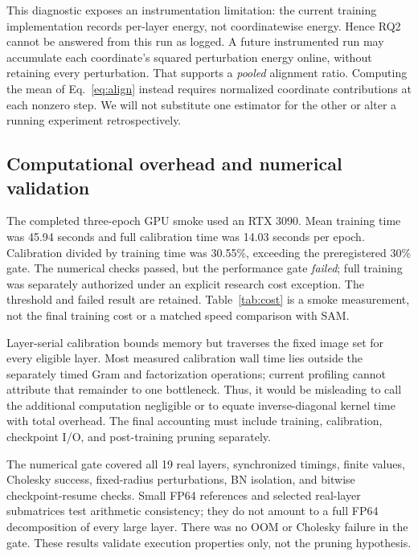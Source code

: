 This diagnostic exposes an instrumentation limitation: the current training implementation records per-layer energy, not coordinatewise energy. Hence RQ2 cannot be answered from this run as logged. A future instrumented run may accumulate each coordinate's squared perturbation energy online, without retaining every perturbation. That supports a \emph{pooled} alignment ratio. Computing the mean of Eq.~\eqref{eq:align} instead requires normalized coordinate contributions at each nonzero step. We will not substitute one estimator for the other or alter a running experiment retrospectively.

\subsection{Computational overhead and numerical validation}
\PerformanceTable
The completed three-epoch GPU smoke used an RTX 3090. Mean training time was 45.94 seconds and full calibration time was 14.03 seconds per epoch. Calibration divided by training time was 30.55\%, exceeding the preregistered 30\% gate. The numerical checks passed, but the performance gate \emph{failed}; full training was separately authorized under an explicit research cost exception. The threshold and failed result are retained. Table~\ref{tab:cost} is a smoke measurement, not the final training cost or a matched speed comparison with SAM.

Layer-serial calibration bounds memory but traverses the fixed image set for every eligible layer. Most measured calibration wall time lies outside the separately timed Gram and factorization operations; current profiling cannot attribute that remainder to one bottleneck. Thus, it would be misleading to call the additional computation negligible or to equate inverse-diagonal kernel time with total overhead. The final accounting must include training, calibration, checkpoint I/O, and post-training pruning separately.

The numerical gate covered all 19 real layers, synchronized timings, finite values, Cholesky success, fixed-radius perturbations, BN isolation, and bitwise checkpoint-resume checks. Small FP64 references and selected real-layer submatrices test arithmetic consistency; they do not amount to a full FP64 decomposition of every large layer. There was no OOM or Cholesky failure in the gate. These results validate execution properties only, not the pruning hypothesis.
